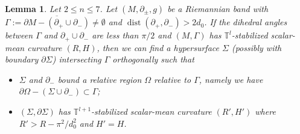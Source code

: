 \documentclass[11pt,letterpaper]{amsart}
\numberwithin{equation}{section}
\newtheorem{lemma}[theorem]{Lemma}
\theoremstyle{definition}
\DeclareMathOperator{\dist}{dist}
\begin{document}
\begin{lemma}\label{Lem: corner mu bubble}
Let $2\leq n\leq 7$. Let $(M,\partial_\pm,g)$ be a Riemannian band with $\Gamma:=\overline{\partial M-(\partial_+\cup\partial_-)}\neq\emptyset$ and $\dist(\partial_+,\partial_-)>2d_0$. If the dihedral angles between $\Gamma$ and $\partial_+\cup\partial_-$ are less than $\pi/2$ and $(M,\Gamma)$ has $\mathbb T^l$-stabilized scalar-mean curvature $(R,H)$, then we can find a hypersurface $\Sigma$ (possibly with boundary $\partial\Sigma$) intersecting $\Gamma$ orthogonally such that
\begin{itemize}\setlength{\itemsep}{1mm}
\item $\Sigma$ and $\partial_-$ bound a relative region $\Omega$ relative to $\Gamma$, namely we have $\partial\Omega-(\Sigma\cup \partial_-)\subset \Gamma$;
\item $(\Sigma,\partial\Sigma)$ has $\mathbb T^{l+1}$-stabilized scalar-mean curvature $(R',H')$ where {$R' > R-\pi^2/d_0^2$} and $H'=H$.
\end{itemize}
\end{lemma}
\end{document}
